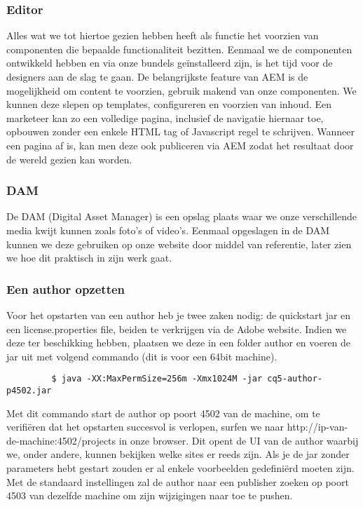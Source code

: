 
	\subsubsection{Editor}
	Alles wat we tot hiertoe gezien hebben heeft als functie het voorzien van componenten die bepaalde functionaliteit bezitten. Eenmaal we de componenten ontwikkeld hebben en via onze bundels ge\"installeerd zijn, is het tijd voor de designers aan de slag te gaan. De belangrijkste feature van AEM is de mogelijkheid om content te voorzien, gebruik makend van onze componenten. We kunnen deze slepen op templates, configureren en voorzien van inhoud. Een marketeer kan zo een volledige pagina, inclusief de navigatie hiernaar toe, opbouwen zonder een enkele HTML tag of Javascript regel te schrijven. Wanneer een pagina af is, kan men deze ook publiceren via AEM zodat het resultaat door de wereld gezien kan worden.
	\subsubsection{DAM}
	De DAM (Digital Asset Manager) is een opslag plaats waar we onze verschillende media kwijt kunnen zoals foto's of video's. Eenmaal opgeslagen in de DAM kunnen we deze gebruiken op onze website door middel van referentie, later zien we hoe dit praktisch in zijn werk gaat.
	\subsubsection{Een author opzetten}
	Voor het opstarten van een author heb je twee zaken nodig: de quickstart jar en een license.properties file, beiden te verkrijgen via de Adobe website. Indien we deze ter beschikking hebben, plaatsen we deze in een folder \textquotedbl author\textquotedbl{} en voeren de jar uit met volgend commando (dit is voor een 64bit machine).
	\begin{lstlisting}
		 $ java -XX:MaxPermSize=256m -Xmx1024M -jar cq5-author-p4502.jar
	\end{lstlisting}	
	\par
	Met dit commando start de author op poort 4502 van de machine, om te verifi\"eren dat het opstarten succesvol is verlopen, surfen we naar \textquotedbl http://ip-van-de-machine:4502/projects\textquotedbl{} in onze browser. Dit opent de UI van de author waarbij we, onder andere, kunnen bekijken welke sites er reeds zijn. Als je de jar zonder parameters hebt gestart zouden er al enkele voorbeelden gedefini\"erd moeten zijn. Met de standaard instellingen zal de author naar een publisher zoeken op poort 4503 van dezelfde machine om zijn wijzigingen naar toe te pushen.
